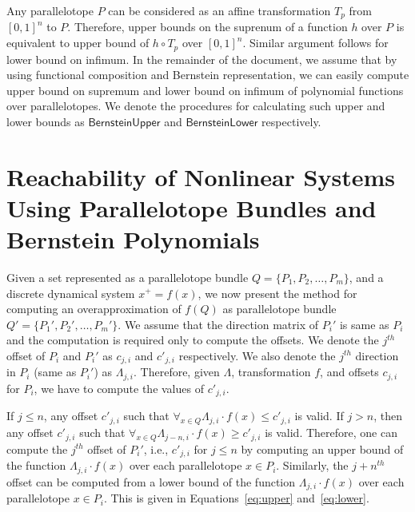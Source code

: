 \documentclass[EPiC]{easychair}
\begin{document}
Any parallelotope $P$ can be considered as an affine transformation $T_{p}$ from $[0,1]^{n}$ to $P$. 
%
Therefore, upper bounds on the suprenum of a function $h$ over $P$ is equivalent to upper bound of $h \circ T_{p}$ over $[0,1]^{n}$.
%
Similar argument follows for lower bound on infimum.
%
In the remainder of the document, we assume that by using functional composition and Bernstein representation, we can easily compute upper bound on supremum and lower bound on infimum of polynomial functions over parallelotopes.
%
We denote the procedures for calculating such upper and lower bounds as $\mathsf{BernsteinUpper}$ and $\mathsf{BernsteinLower}$ respectively.

\section{Reachability of Nonlinear Systems Using Parallelotope Bundles and Bernstein Polynomials}

Given a set represented as a parallelotope bundle $Q = \{P_1, P_2, \ldots, P_m\}$, and a discrete dynamical system $x^{+} = f(x)$, we now present the method for computing an overapproximation of $f(Q)$ as parallelotope bundle $Q' = \{P_1', P_2', \ldots, P_m'\}$.
%
We assume that the direction matrix of $P_i'$ is same as $P_i$ and the computation is required only to compute the offsets. 
%
We denote the $j^{th}$ offset of $P_i$ and $P_i'$ as $c_{j,i}$ and $c'_{j,i}$ respectively. %
We also denote the $j^{th}$ direction in $P_i$ (same as $P_i'$) as $\Lambda_{j,i}$.
%
Therefore, given $\Lambda$, transformation $f$, and offsets $c_{j,i}$ for $P_i$, we have to compute the values of $c'_{j,i}$.

%
%
If $j \leq n$, any offset $c'_{j,i}$ such that $\forall_{x\in Q} \Lambda_{j,i} \cdot f(x) \leq c'_{j,i}$ is valid.
%
%
If $j > n$, then any offset $c'_{j,i}$ such that $\forall_{x \in Q} \Lambda_{j-n,i} \cdot f(x) \geq c'_{j,i}$ is valid.
%
Therefore, one can compute the $j^{th}$ offset of $P_i'$, i.e., $c'_{j,i}$ for $j \leq n$ by computing an upper bound of the function $\Lambda_{j,i} \cdot f(x)$ over each parallelotope $x\in P_i$.
%
Similarly, the $j+n^{th}$ offset can be computed from a lower bound of the function $\Lambda_{j,i} \cdot f(x)$ over each parallelotope $x\in P_i$.
%
This is given in Equations~\ref{eq:upper} and~\ref{eq:lower}.
\end{document}
